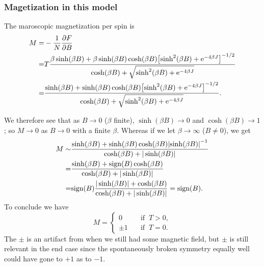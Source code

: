 \documentclass[11pt,letter, swedish, english
]{article}
\newcommand{\sign}{\ensuremath{\text{sign}}}
\begin{document}
\subsubsection*{Magetization in this model}
The maroscopic magnetization per spin is
\begin{equation}
\begin{aligned}
M=&-\frac{1}{N}\pdv{F}{B}\\
=&T\frac{\beta\sinh(\beta B)
+\beta\sinh(\beta B)\cosh(\beta B)
\qty[\sinh^2(\beta B)+\mathrm{e}^{-4\beta J}]^{-1/2}}
{\cosh(\beta B)+\sqrt{\sinh^2(\beta B)+\mathrm{e}^{-4\beta J}}}\\
=&\frac{\sinh(\beta B)
+\sinh(\beta B)\cosh(\beta B)
\qty[\sinh^2(\beta B)+\mathrm{e}^{-4\beta J}]^{-1/2}}
{\cosh(\beta B)+\sqrt{\sinh^2(\beta B)+\mathrm{e}^{-4\beta J}}}.
\end{aligned}
\end{equation}

We therefore see that as $B\to0$ ($\beta$ finite), $\sinh(\beta
B)\to0$ and $\cosh(\beta B)\to1$; so $M\to0$ as $B\to0$ with a finite 
$\beta$. Whereas if we let $\beta\to\infty$ ($B\neq0$), we
get\footnotemark{} 
\begin{equation}
\begin{aligned}
M\sim&\frac{\sinh(\beta B)
+\sinh(\beta B)\cosh(\beta B)
\qty|\sinh(\beta B)|^{-1}}
{\cosh(\beta B)+|\sinh(\beta B)|}\\
=&\frac{\sinh(\beta B)+\sign(B)\cosh(\beta B)}
{\cosh(\beta B)+|\sinh(\beta B)|}\\
=&\sign(B)\frac{|\sinh(\beta B)|+\cosh(\beta B)}
{\cosh(\beta B)+|\sinh(\beta B)|}
=\sign(B).
\end{aligned}
\end{equation}
To conclude we have
\begin{equation}
M=\begin{cases}
0\quad&\text{if }\ T>0,\\
\pm1\quad&\text{if }\ T=0.
\end{cases}
\end{equation}
The $\pm$ is an artifact from when we still had some magnetic field,
but $\pm$ is still relevant in the end case since the spontaneously
broken symmetry equally well could have gone to $+1$ as to $-1$. 

\end{document}
